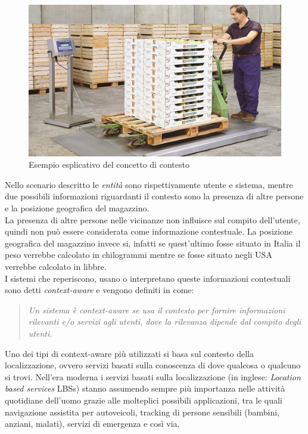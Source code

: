 \begin{figure}[H]  
	\centering 
	\includegraphics[scale=0.4 ]{ContestoApplicativo/bilancia.jpg}
	\caption{Esempio esplicativo del concetto di contesto}
	\label{fig:context}
\end{figure}
Nello scenario descritto le \textit{entità} sono rispettivamente utente e sistema, mentre due possibili informazioni riguardanti il contesto sono la presenza di altre persone e la posizione geografica del magazzino.\\
La presenza di altre persone nelle vicinanze non influisce sul compito dell'utente, quindi non può essere considerata come informazione contestuale. La posizione geografica del magazzino invece si, infatti se quest'ultimo fosse situato in Italia il peso verrebbe calcolato in chilogrammi mentre se fosse situato negli USA verrebbe calcolato in libbre.\\
I sistemi che reperiscono, usano o interpretano queste informazioni contestuali sono detti \textit{context-aware} e vengono definiti in \cite{context} come:
\begin{quotation}
	\textit{Un sistema è context-aware se usa il contesto per fornire informazioni rilevanti e/o servizi agli utenti, dove la rilevanza dipende dal compito degli utenti.}
\end{quotation}
Uno dei tipi di context-aware più utilizzati si basa sul contesto della localizzazione, ovvero servizi basati sulla conoscenza di dove qualcosa o qualcuno si trovi. Nell'era moderna i servizi basati sulla localizzazione (in inglese: \textit{Location based services} LBSs) stanno assumendo sempre più importanza nelle attività quotidiane dell'uomo grazie alle molteplici possibili applicazioni, tra le quali navigazione assistita per autoveicoli, tracking di persone sensibili (bambini, anziani, malati), servizi di emergenza e così via.\\
